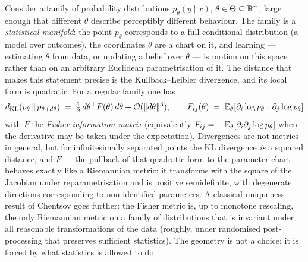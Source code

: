 Consider a family of probability distributions
$p_\theta(y\mid x)$, $\theta \in \Theta \subseteq \mathbb{R}^{n}$, large enough that
different $\theta$ describe perceptibly different behaviour. The family is a
\emph{statistical manifold}: the point $p_\theta$ corresponds to a full
conditional distribution (a model over outcomes), the coordinates $\theta$ are
a chart on it, and learning --- estimating $\theta$ from data, or updating a
belief over $\theta$ --- is motion on this space rather than on an arbitrary
Euclidean parametrisation of it. The distance that makes this statement
precise is the Kullback--Leibler divergence, and its local form is quadratic.
For a regular family one has
\begin{equation}
d_{\mathrm{KL}}\!\left(p_\theta \,\|\, p_{\theta + d\theta}\right)
\;=\; \tfrac{1}{2}\, d\theta^{\top} F(\theta)\, d\theta
    + \mathcal{O}(\lVert d\theta \rVert^{3}),
\qquad
F_{ij}(\theta) \;=\;
\mathbb{E}_\theta\!\left[\partial_i \log p_\theta \,\cdot \partial_j \log p_\theta\right]
\label{eq:geo-kl}
\end{equation}
with $F$ the \emph{Fisher information matrix} (equivalently
$F_{ij} = -\,\mathbb{E}_\theta\!\left[\partial_i \partial_j \log p_\theta\right]$ when
the derivative may be taken under the expectation). Divergences are not
metrics in general, but for infinitesimally separated points the KL
divergence \emph{is} a squared distance, and $F$ --- the pullback of that
quadratic form to the parameter chart --- behaves exactly like a Riemannian
metric: it transforms with the square of the Jacobian under
reparametrisation and is positive semidefinite, with degenerate directions
corresponding to non-identified parameters. A classical uniqueness result of
Chentsov \cite{chentsov1972} goes further: the Fisher metric is, up to
monotone rescaling, the
only Riemannian metric on a family of distributions that is invariant under
all reasonable transformations of the data (roughly, under randomised
post-processing that preserves sufficient statistics). The geometry is not a
choice; it is forced by what statistics is allowed to do.

